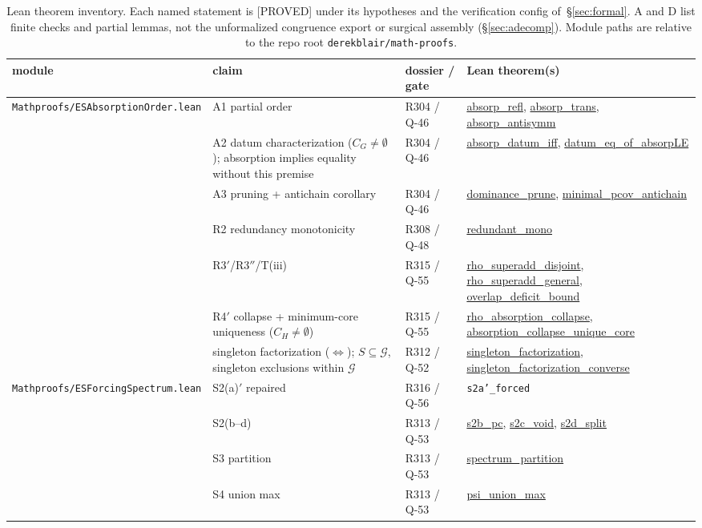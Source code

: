 \documentclass[11pt,a4paper]{article}
\theoremstyle{definition}
\begin{document}
\begin{table}[t]
  \centering
  \caption{Lean theorem inventory. Each named statement is [PROVED] under
    its hypotheses and the verification config of~\S\ref{sec:formal}.
    A and D list finite checks and partial lemmas, not the unformalized
    congruence export or surgical assembly (\S\ref{sec:adecomp}). Module paths are
    relative to the repo root \texttt{derekblair/math-proofs}.}
  \label{tab:lean}
  \begin{tabular}{p{3.6cm}p{4.6cm}p{2.6cm}p{3.6cm}}
    \toprule
    module & claim & dossier / gate & Lean theorem(s) \\
    \midrule
    \texttt{\small Mathproofs/ESAbsorptionOrder.lean} &
      A1 partial order & R304 / Q-46 &
      {\small\url{absorp_refl}, \url{absorp_trans},
      \url{absorp_antisymm}} \\
    & A2 datum characterization ($C_G\ne\emptyset$); absorption implies
      equality without this premise & R304 / Q-46 &
      {\small\url{absorp_datum_iff}, \url{datum_eq_of_absorpLE}} \\
    & A3 pruning + antichain corollary & R304 / Q-46 &
      {\small\url{dominance_prune}, \url{minimal_pcov_antichain}} \\
    & R2 redundancy monotonicity & R308 / Q-48 &
      {\small\url{redundant_mono}} \\
    & R3$'$/R3$''$/T(iii) & R315 / Q-55 &
      {\small\url{rho_superadd_disjoint},
      \url{rho_superadd_general}, \url{overlap_deficit_bound}} \\
    & R4$'$ collapse + minimum-core uniqueness ($C_H\ne\emptyset$) & R315 / Q-55 &
      {\small\url{rho_absorption_collapse},
      \url{absorption_collapse_unique_core}} \\
    & singleton factorization ($\iff$); $S\subseteq\mathcal G$,
      singleton exclusions within $\mathcal G$ & R312 / Q-52 &
      {\small\url{singleton_factorization},
      \url{singleton_factorization_converse}} \\
    \texttt{\small Mathproofs/ESForcingSpectrum.lean} &
      S2(a)$'$ repaired & R316 / Q-56 &
      {\small\texttt{s2a'\_forced}} \\
    & S2(b--d) & R313 / Q-53 &
      {\small\url{s2b_pc}, \url{s2c_void}, \url{s2d_split}} \\
    & S3 partition & R313 / Q-53 &
      {\small\url{spectrum_partition}} \\
    & S4 union max & R313 / Q-53 &
      {\small\url{psi_union_max}} \\

\end{tabular}
\end{table}
\end{document}
